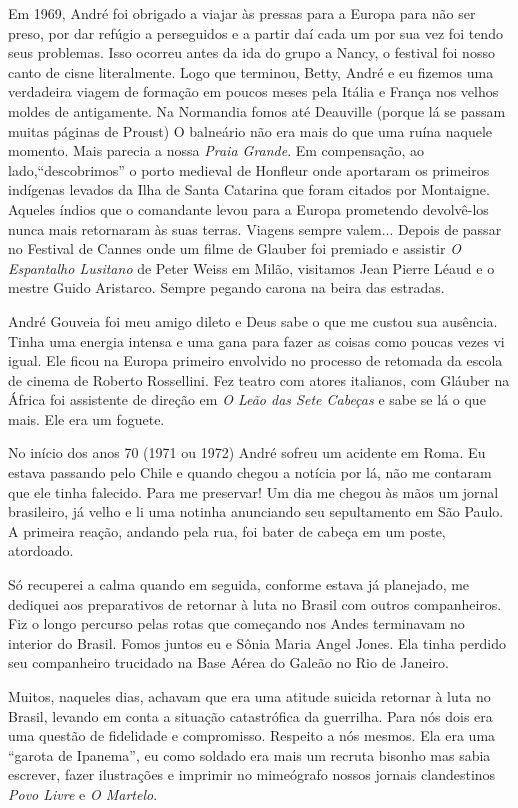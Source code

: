 Em 1969, André foi obrigado a viajar às pressas para a Europa para não
ser preso, por dar refúgio a perseguidos e a partir daí cada um por sua
vez foi tendo seus problemas. Isso ocorreu antes da ida do grupo a
Nancy, o festival foi nosso canto de cisne literalmente. Logo que
terminou, Betty, André e eu fizemos uma verdadeira viagem de formação em
poucos meses pela Itália e França nos velhos moldes de antigamente. Na
Normandia fomos até Deauville (porque lá se passam muitas páginas de
Proust) O balneário não era mais do que uma ruína naquele momento. Mais
parecia a nossa {\it Praia Grande}. Em compensação, ao
lado,“descobrimos” o porto medieval de Honfleur onde aportaram os
primeiros indígenas levados da Ilha de Santa Catarina que foram citados
por Montaigne. Aqueles índios que o comandante levou para a Europa
prometendo devolvê-los nunca mais retornaram às suas terras. Viagens
sempre valem... Depois de passar no Festival de Cannes onde um filme de
Glauber foi premiado e assistir {\it O Espantalho Lusitano} de Peter
Weiss em Milão, visitamos Jean Pierre Léaud e o mestre Guido Aristarco.
Sempre pegando carona na beira das estradas.

André Gouveia foi meu amigo dileto e Deus sabe o que me custou sua
ausência. Tinha uma energia intensa e uma gana para fazer as coisas como
poucas vezes vi igual. Ele ficou na Europa primeiro envolvido no
processo de retomada da escola de cinema de Roberto Rossellini. Fez
teatro com atores italianos, com Gláuber na África foi assistente de
direção em {\it O Leão das Sete Cabeças} e sabe se lá o que mais. Ele
era um foguete.

No início dos anos 70 (1971 ou 1972) André sofreu um acidente em Roma.
Eu estava passando pelo Chile e quando chegou a notícia por lá, não me
contaram que ele tinha falecido. Para me preservar! Um dia me chegou às
mãos um jornal brasileiro, já velho e li uma notinha anunciando seu
sepultamento em São Paulo. A primeira reação, andando pela rua, foi
bater de cabeça em um poste, atordoado.

Só recuperei a calma quando em seguida, conforme estava já planejado, me
dediquei aos preparativos de retornar à luta no Brasil com outros
companheiros. Fiz o longo percurso pelas rotas que começando nos Andes
terminavam no interior do Brasil. Fomos juntos eu e Sônia Maria Angel
Jones. Ela tinha perdido seu companheiro trucidado na Base Aérea do
Galeão no Rio de Janeiro.

Muitos, naqueles dias, achavam que era uma atitude suicida retornar à
luta no Brasil, levando em conta a situação catastrófica da guerrilha.
Para nós dois era uma questão de fidelidade e compromisso. Respeito a
nós mesmos. Ela era uma “garota de Ipanema”, eu como soldado era mais um
recruta bisonho mas sabia escrever, fazer ilustrações e imprimir no
mimeógrafo nossos jornais clandestinos {\it Povo Livre} e {\it O
Martelo}.

